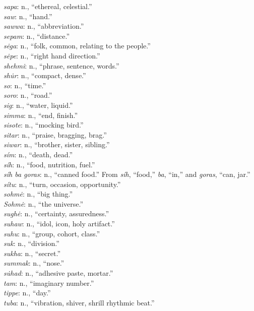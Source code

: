\documentclass{article}[10pt]
\begin{document}
\begin{multicols}{3}
\emph{sapa}: n., ``ethereal, celestial.''\\
\emph{saw}: n., ``hand.''\\
\emph{sawwa}: n., ``abbreviation.''\\
\emph{sepam}: n., ``distance.''\\
\emph{s\.{e}ga}: n., ``folk, common, relating to the people.''\\
\emph{s\.{e}pe}: n., ``right hand direction.''\\
\emph{shehmi}: n., ``phrase, sentence, words.''\\
\emph{sh\.{u}r}: n., ``compact, dense.''\\
\emph{so}: n., ``time.''\\
\emph{soro}: n., ``road.''\\
\emph{sig}: n., ``water, liquid.''\\
\emph{simma}: n., ``end, finish.''\\
\emph{sisote}: n., ``mocking bird.''\\
\emph{sitar}: n., ``praise, bragging, brag.''\\
\emph{siwar}: n., ``brother, sister, sibling.''\\
\emph{s\'{i}m}: n., ``death, dead.''\\
\emph{s\'{i}h}: n., ``food, nutrition, fuel.''\\
\emph{s\'{i}h ba goras}: n., ``canned food.'' From \emph{s\'{i}h}, ``food,'' \emph{ba}, ``in,'' and \emph{goras}, ``can, jar.''\\
\emph{s\'{i}tu}: n., ``turn, occasion, opportunity.''\\
\emph{sohm\.{e}}: n., ``big thing.''\\
\emph{Sohm\.{e}}: n., ``the universe.''\\
\emph{sugh\.{e}}: n., ``certainty, assuredness.''\\
\emph{suhaw}: n., ``idol, icon, holy artifact.''\\
\emph{suhu}: n., ``group, cohort, class.''\\
\emph{suk}: n., ``division.''\\
\emph{sukha}: n., ``secret.''\\
\emph{summak}: n., ``nose.''\\
\emph{s\.{u}had}: n., ``adhesive paste, mortar.''\\
\emph{tam}: n., ``imaginary number.''\\
\emph{tippe}: n., ``day.''\\
\emph{tuba}: n., ``vibration, shiver, shrill rhythmic beat.''\\

\end{multicols}
\end{document}
